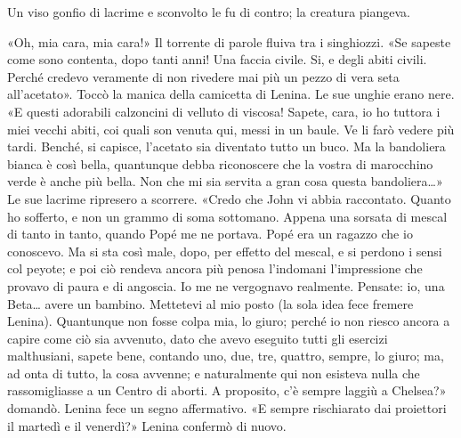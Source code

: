 \documentclass[
a5paper, %
10pt, %
twoside, 
onecolumn, %
openany, %
]{memoir}
\begin{document}
Un viso gonfio di lacrime e sconvolto le fu di contro; la creatura piangeva.

«Oh, mia cara, mia cara!» Il torrente di parole fluiva tra i singhiozzi. «Se sapeste come sono contenta, dopo tanti anni! Una faccia civile. Si, e degli abiti civili. Perché credevo veramente di non rivedere mai più un pezzo di vera seta all’acetato». Toccò la manica della camicetta di Lenina. Le sue unghie erano nere. «E questi adorabili calzoncini di velluto di viscosa! Sapete, cara, io ho tuttora i miei vecchi abiti, coi quali son venuta qui, messi in un baule. Ve li farò vedere più tardi. Benché, si capisce, l’acetato sia diventato tutto un buco. Ma la bandoliera bianca è così bella, quantunque debba riconoscere che la vostra di marocchino verde è anche più bella. Non che mi sia servita a gran cosa questa bandoliera…» Le sue lacrime ripresero a scorrere. «Credo che John vi abbia raccontato. Quanto ho sofferto, e non un grammo di soma sottomano. Appena una sorsata di mescal di tanto in tanto, quando Popé me ne portava. Popé era un ragazzo che io conoscevo. Ma si sta così male, dopo, per effetto del mescal, e si perdono i sensi col peyote; e poi ciò rendeva ancora più penosa l’indomani l’impressione che provavo di paura e di angoscia. Io me ne vergognavo realmente. Pensate: io, una Beta… avere un bambino. Mettetevi al mio posto (la sola idea fece fremere Lenina). Quantunque non fosse colpa mia, lo giuro; perché io non riesco ancora a capire come ciò sia avvenuto, dato che avevo eseguito tutti gli esercizi malthusiani, sapete bene, contando uno, due, tre, quattro, sempre, lo giuro; ma, ad onta di tutto, la cosa avvenne; e naturalmente qui non esisteva nulla che rassomigliasse a un Centro di aborti. A proposito, c’è sempre laggiù a Chelsea?» domandò. Lenina fece un segno affermativo. «E sempre rischiarato dai proiettori il martedì e il venerdì?» Lenina confermò di nuovo.
\end{document}
